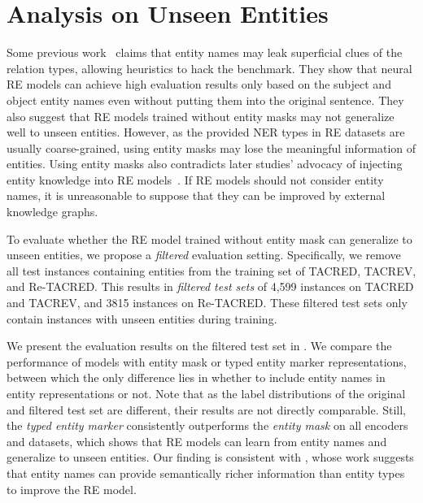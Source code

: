 \documentclass[11pt,a4paper]{article}
\begin{document}
\section{Analysis on Unseen Entities}\label{ssec:exp_unseen}

Some previous work~\cite{zhang-etal-2018-graph,joshi-etal-2020-spanbert} claims that entity names may leak superficial clues of the relation types, allowing heuristics to hack the benchmark.
They show that neural RE models can achieve high evaluation results only based on the subject and object entity names even without putting them into the original sentence.
They also suggest that RE models trained without entity masks may not generalize well to unseen entities.
However, as the provided NER types in RE datasets are usually coarse-grained, using entity masks may lose the meaningful information of entities.
Using entity masks also contradicts later studies' advocacy of injecting entity knowledge into RE models~\cite{zhang-etal-2019-ernie,peters-etal-2019-knowledge,wang2020k}.
If RE models should not consider entity names, it is unreasonable to suppose that they can be improved by external knowledge graphs.

To evaluate whether the RE model trained without entity mask can generalize to unseen entities, we propose a \textit{filtered} evaluation setting. Specifically, we remove all test instances containing entities from the training set of TACRED, TACREV, and Re-TACRED. This results in \textit{filtered test sets} of 4,599 instances on TACRED and TACREV, and 3815 instances on Re-TACRED.
These filtered test sets only contain instances with unseen entities during training.

We present the evaluation results on the filtered test set in .
We compare the performance of models with entity mask or typed entity marker representations, between which the only difference lies in whether to include entity names in entity representations or not.
Note that as the label distributions of the original and filtered test set are different, their results are not directly comparable.
Still, the \emph{typed entity marker} consistently outperforms the \emph{entity mask} on all encoders and datasets, which shows that RE models can learn from entity names and generalize to unseen entities.
Our finding is consistent with \citet{peng-etal-2020-learning}, whose work suggests that entity names can provide semantically richer information than entity types to improve the RE model.
\end{document}
